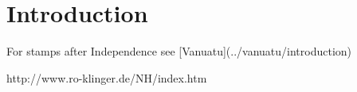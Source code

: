 
\section{Introduction}

For stamps after Independence see [Vanuatu](../vanuatu/introduction)

http://www.ro-klinger.de/NH/index.htm    